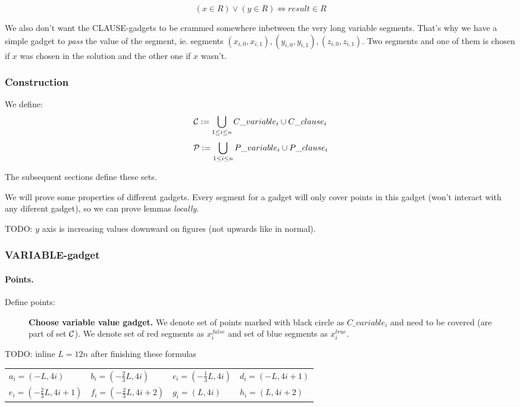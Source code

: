 $$ (x \in R) \lor (y \in R) \iff result \in R  $$


We also don't want the CLAUSE-gadgets to be crammed 
somewhere inbetween
the very long variable segments. That's why we have a simple
gadget to \textit{pass} the value of the segment, ie. segments
$(x_{i, 0}, x_{i, 1}), (y_{i, 0}, y_{i, 1}), (z_{i, 0}, z_{i, 1})$.
Two segments and one of them is chosen if $x$ was chosen
in the solution and the other one if $x$ wasn't.


\subsubsection{Construction}

We define:
$$\mathcal{C} := \bigcup_{1 \le i \le n} C\_variable_i \cup C\_clause_i $$
$$\mathcal{P} := \bigcup_{1 \le i \le n} P\_variable_i \cup P\_clause_i $$

The subsequent sections define these sets.

We will prove some properties of different gadgets.
Every segment for a gadget will only cover points 
in this gadget (won't interact with any diferent gadget),
so we can prove lemmas \textit{locally}.


TODO: $y$ axis is increasing values downward on figures
(not upwards like in normal).

\subsubsection{VARIABLE-gadget}

\paragraph{Points.}

Define points:
\begin{figure}[h]
\centering
\def\svgwidth{0.5\columnwidth}

\caption{\textbf{Choose variable value gadget.}
We denote set of points marked with black circle as $C\_variable_i$
and need to be covered (are part of set $\mathcal{C}$).
We denote set of red segments as $x^{false}_i$
and set of blue segments as $x^{true}_i$.}
\label{fig:apx_choose_variable}
\end{figure}

TODO: inline $L = 12n$ after finishing these formulas

\begin{center}
\begin{tabular}{ l l l l}
	$a_{i} = (-L, 4i)$ &
	$b_{i} = (-\frac{2}{3}L, 4i)$ & 
	$c_{i} = (-\frac{1}{3}L, 4i)$ & 
	$d_{i} = (-L, 4i+1)$ \\  
	$e_{i} = (-\frac{2}{3}L, 4i+1)$ & 
	$f_{i} = (-\frac{2}{3}L, 4i+2)$ &
	$g_i = (L, 4i)$ &
	$h_i = (L, 4i+2)$
\end{tabular}
\end{center}

